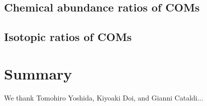 \documentclass[linenumbers, twocolumn, twocolappendix, astrosymb, times]{aastex631}
\begin{document}
\subsection{Chemical abundance ratios of COMs}
\subsection{Isotopic ratios of COMs}


\section{Summary} \label{sec:summary}


\begin{acknowledgments}
We thank Tomohiro Yoshida, Kiyoaki Doi, and Gianni Cataldi...
\end{acknowledgments}

%

\vspace{5mm}




\end{document}
